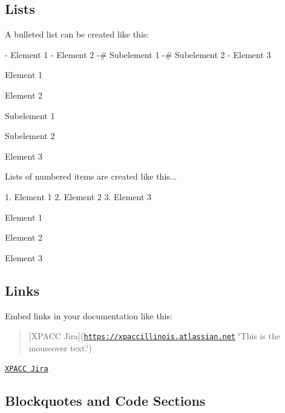 \subsection*{Lists }

A bulleted list can be created like this\+: \begin{DoxyVerb} - Element 1
 - Element 2
   -# Subelement 1
   -# Subelement 2
 - Element 3
\end{DoxyVerb}



\begin{DoxyItemize}
\item Element 1
\item Element 2
\begin{DoxyEnumerate}
\item Subelement 1
\item Subelement 2
\end{DoxyEnumerate}
\item Element 3
\end{DoxyItemize}

Lists of numbered items are created like this... \begin{DoxyVerb} 1. Element 1
 2. Element 2
 3. Element 3
\end{DoxyVerb}



\begin{DoxyEnumerate}
\item Element 1
\item Element 2
\item Element 3
\end{DoxyEnumerate}

\subsection*{Links }

Embed links in your documentation like this\+: ~\newline
 \begin{quote}
\mbox{[}X\+P\+A\+CC Jira\mbox{]}(\href{https://xpaccillinois.atlassian.net}{\tt https\+://xpaccillinois.\+atlassian.\+net} \char`\"{}\+This is the mouseover text.\char`\"{})~\newline
\end{quote}


\href{https://xpaccillinois.atlassian.net}{\tt X\+P\+A\+CC Jira}~\newline


\subsection*{Blockquotes and Code Sections }

